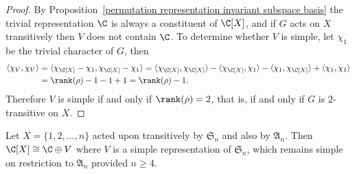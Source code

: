 \begin{proof}
By Proposition~\ref{permutation representation invariant subspace basis} the trivial representation $\C$ is always a constituent of $\C[X]$, and if $G$ acts on $X$ transitively then $V$ does not contain $\C$. To determine whether $V$ is simple, let $\chi_1$ be the trivial character of $G$, then
\begin{align*}
\langle\chi_{V},\chi_{V}\rangle&=\langle\chi_{\C[X]}-\chi_1,\chi_{\C[X]}-\chi_1\rangle=\langle\chi_{\C[X]},\chi_{\C[X]}\rangle-\langle\chi_{\C[X]},\chi_1\rangle-\langle\chi_1,\chi_{\C[X]}\rangle+\langle\chi_1,\chi_1\rangle\\
&=\rank(\rho)-1-1+1=\rank(\rho)-1.
\end{align*}
Therefore $V$ is simple if and only if $\rank(\rho)=2$, that is, if and only if $G$ is $2$-transitive on $X$.
\end{proof}
\begin{example}
Let $X=\{1,2,\dots,n\}$ acted upon transitively by $\mathfrak{S}_n$ and also by $\mathfrak{A}_n$. Then $\C[X]\cong \C\oplus V$ where $V$ is a simple representation of $\mathfrak{S}_n$, which remains simple on restriction to $\mathfrak{A}_n$ provided $n\geq 4$.
\end{example}
